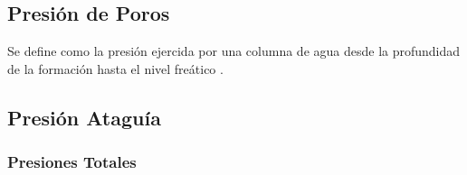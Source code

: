 \subsection{Presión de Poros}

Se define como la presión ejercida por una columna de agua desde la profundidad de la formación hasta el nivel freático \textbf{\cite{por2024}}.

\subsection{Presión Ataguía}

\subsubsection{Presiones Totales}


